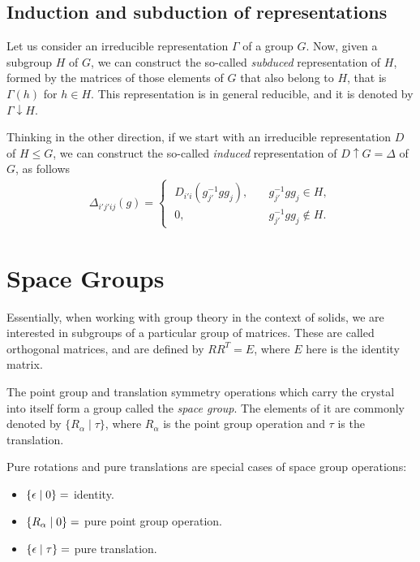 \subsection{Induction and subduction of representations}

Let us consider an irreducible representation $\Gamma$ of a group $G$. Now, given a subgroup $H$ of $G$, we can construct the so-called \textit{subduced} representation of $H$, formed by the matrices of those elements of $G$ that also belong to $H$, that is $\Gamma(h)$ for $h \in H$. This representation is in general reducible, and it is denoted by $\Gamma \downarrow H$.

Thinking in the other direction, if we start with an irreducible representation $D$ of $H \leq G$, we can construct the so-called \textit{induced} representation of $D \uparrow G = \Delta$ of $G$, as follows
\begin{align*}
\Delta_{i'j'ij}(g) =
\begin{cases}
\; D_{i'i}(g_{j'}^{-1} g g_j), \quad & g_{j'}^{-1} g g_j \in H, \\
\; 0,  & g_{j'}^{-1} g g_j \notin H.
\end{cases}
\end{align*}


\section{Space Groups}


Essentially, when working with group theory in the context of solids, we are interested in subgroups of a particular group of matrices. These are called orthogonal matrices, and are defined by $R R^T = E$, where $E$ here is the identity matrix.

\n

The point group and translation symmetry operations which carry the crystal into itself form a group called the \textit{space group}. The elements of it are commonly denoted by  $\{ R_\alpha \mid \tau \} $, where $R_\alpha$ is the point group operation and $\tau$ is the translation.

Pure rotations and pure translations are special cases of space group operations:
\begin{itemize}
\item $\{ \epsilon \mid 0 \} =$ identity.
\item $\{ R_\alpha \mid 0 \} =$ pure point group operation.
\item $\{ \epsilon \mid \tau \} =$ pure translation.
\end{itemize}

